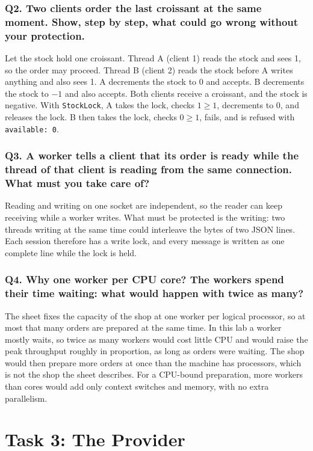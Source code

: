 \documentclass[12pt,a4paper]{article}
\begin{document}
    \subsubsection{Q2. Two clients order the last croissant at the same moment. Show, step by step, what could go wrong without your protection.}
    Let the stock hold one croissant. Thread A (client 1) reads the stock and sees 1,
    so the order may proceed. Thread B (client 2) reads the stock before A writes
    anything and also sees 1. A decrements the stock to 0 and accepts. B decrements
    the stock to $-1$ and also accepts. Both clients receive a croissant, and the
    stock is negative. With \texttt{StockLock}, A takes the lock, checks $1 \ge 1$,
    decrements to 0, and releases the lock. B then takes the lock, checks $0 \ge 1$,
    fails, and is refused with \texttt{available: 0}.

    \subsubsection{Q3. A worker tells a client that its order is ready while the thread of that client is reading from the same connection. What must you take care of?}
    Reading and writing on one socket are independent, so the reader can keep receiving
    while a worker writes. What must be protected is the writing: two threads writing at
    the same time could interleave the bytes of two JSON lines. Each session therefore
    has a write lock, and every message is written as one complete line while the lock
    is held.

    \subsubsection{Q4. Why one worker per CPU core? The workers spend their time waiting: what would happen with twice as many?}
    The sheet fixes the capacity of the shop at one worker per logical processor, so at
    most that many orders are prepared at the same time. In this lab a worker mostly
    waits, so twice as many workers would cost little CPU and would raise the peak
    throughput roughly in proportion, as long as orders were waiting. The shop would
    then prepare more orders at once than the machine has processors, which is not the
    shop the sheet describes. For a CPU-bound preparation, more workers than cores would
    add only context switches and memory, with no extra parallelism.

\section{Task 3: The Provider}
\label{sec:task3}
\end{document}
